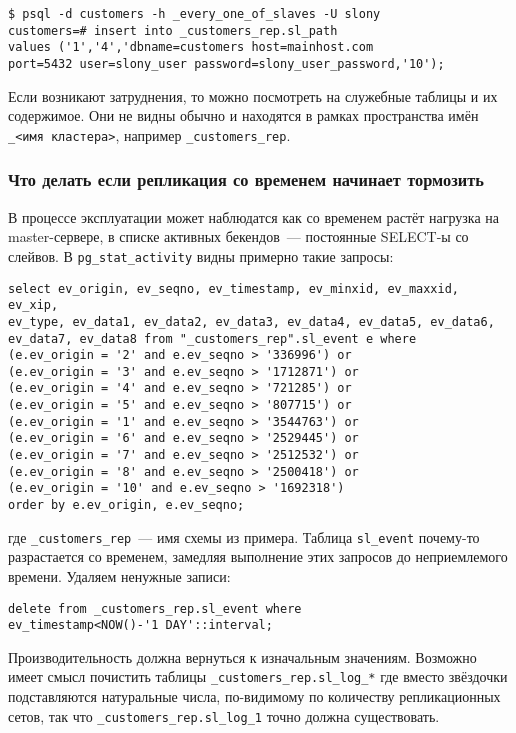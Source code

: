 \begin{lstlisting}[label=lst:slony18,caption=Устранение неисправностей]
$ psql -d customers -h _every_one_of_slaves -U slony
customers=# insert into _customers_rep.sl_path
values ('1','4','dbname=customers host=mainhost.com
port=5432 user=slony_user password=slony_user_password,'10');
\end{lstlisting}

Если возникают затруднения, то можно посмотреть на служебные таблицы и их содержимое. Они не видны обычно и находятся в рамках пространства имён \lstinline!_<имя кластера>!, например \lstinline!_customers_rep!.

\subsubsection{Что делать если репликация со временем начинает тормозить}

В процессе эксплуатации может наблюдатся как со временем растёт нагрузка на master-сервере, в списке активных бекендов~--- постоянные SELECT-ы со слейвов. В \lstinline!pg_stat_activity! видны примерно такие запросы:

\begin{lstlisting}[label=lst:slony19,caption=Устранение неисправностей]
select ev_origin, ev_seqno, ev_timestamp, ev_minxid, ev_maxxid, ev_xip,
ev_type, ev_data1, ev_data2, ev_data3, ev_data4, ev_data5, ev_data6,
ev_data7, ev_data8 from "_customers_rep".sl_event e where
(e.ev_origin = '2' and e.ev_seqno > '336996') or
(e.ev_origin = '3' and e.ev_seqno > '1712871') or
(e.ev_origin = '4' and e.ev_seqno > '721285') or
(e.ev_origin = '5' and e.ev_seqno > '807715') or
(e.ev_origin = '1' and e.ev_seqno > '3544763') or
(e.ev_origin = '6' and e.ev_seqno > '2529445') or
(e.ev_origin = '7' and e.ev_seqno > '2512532') or
(e.ev_origin = '8' and e.ev_seqno > '2500418') or
(e.ev_origin = '10' and e.ev_seqno > '1692318')
order by e.ev_origin, e.ev_seqno;
\end{lstlisting}

где \lstinline!_customers_rep!~--- имя схемы из примера. Таблица \lstinline!sl_event! почему-то разрастается со временем, замедляя выполнение этих запросов до неприемлемого времени. Удаляем ненужные записи:

\begin{lstlisting}[label=lst:slony20,caption=Устранение неисправностей]
delete from _customers_rep.sl_event where
ev_timestamp<NOW()-'1 DAY'::interval;
\end{lstlisting}

Производительность должна вернуться к изначальным значениям. Возможно имеет смысл почистить таблицы \lstinline!_customers_rep.sl_log_*! где вместо звёздочки подставляются натуральные числа, по-видимому по количеству репликационных сетов, так что \lstinline!_customers_rep.sl_log_1! точно должна существовать.

